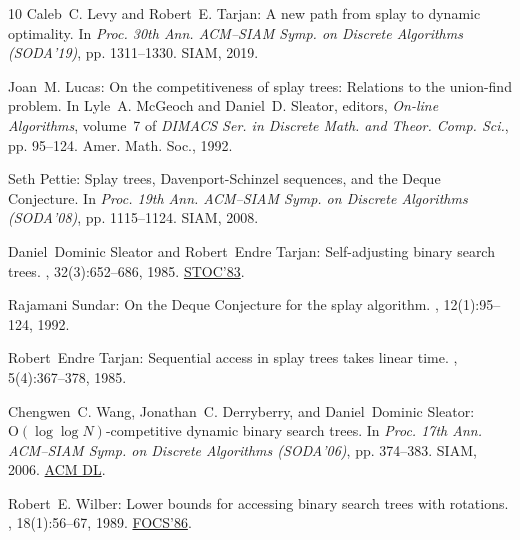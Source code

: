 \begin{thebibliography}{10}
{\sc Caleb~C. Levy and Robert~E. Tarjan}: A new path from splay to dynamic
  optimality.
\newblock In {\em Proc. 30th Ann. ACM--SIAM Symp. on Discrete Algorithms
  (SODA'19)}, pp. 1311--1330. SIAM, 2019.
\newblock [\epfmtdoi{10.1137/1.9781611975482.80}]

{\sc Joan~M. Lucas}: On the competitiveness of splay trees: {R}elations to the
  union-find problem.
\newblock In {\sc Lyle~A. McGeoch and Daniel~D. Sleator}, editors, {\em On-line
  Algorithms}, volume~7 of {\em DIMACS Ser. in Discrete Math. and Theor. Comp.
  Sci.}, pp. 95--124. Amer. Math. Soc., 1992.

{\sc Seth Pettie}: Splay trees, {D}avenport-{S}chinzel sequences, and the
  {D}eque {C}onjecture.
\newblock In {\em Proc. 19th Ann. ACM--SIAM Symp. on Discrete Algorithms
  (SODA'08)}, pp. 1115--1124. SIAM, 2008.

{\sc Daniel~Dominic Sleator and Robert~Endre Tarjan}: Self-adjusting binary
  search trees.
, 32(3):652--686, 1985.
\newblock \prelim \href{https://doi.org/10.1145/800061.808752}{STOC'83}.
\newblock [\epfmtdoi{10.1145/3828.3835}]

{\sc Rajamani Sundar}: On the {D}eque {C}onjecture for the splay algorithm.
, 12(1):95--124, 1992.
\newblock [\epfmtdoi{10.1007/BF01191208}]

{\sc Robert~Endre Tarjan}: Sequential access in splay trees takes linear time.
, 5(4):367--378, 1985.
\newblock [\epfmtdoi{10.1007/BF02579253}]

{\sc Chengwen~C. Wang, Jonathan~C. Derryberry, and Daniel~Dominic Sleator}:
  {$\mathrm{O}(\log \log N)$}-competitive dynamic binary search trees.
\newblock In {\em Proc. 17th Ann. ACM--SIAM Symp. on Discrete Algorithms
  (SODA'06)}, pp. 374--383. SIAM, 2006.
\newblock \href{https://dl.acm.org/doi/10.5555/1109557.1109600}{ACM DL}.

{\sc Robert~E. Wilber}: Lower bounds for accessing binary search trees with
  rotations.
, 18(1):56--67, 1989.
\newblock \prelim \href{https://doi.org/10.1109/SFCS.1986.28}{FOCS'86}.
\newblock [\epfmtdoi{10.1137/0218004}]

\end{thebibliography}